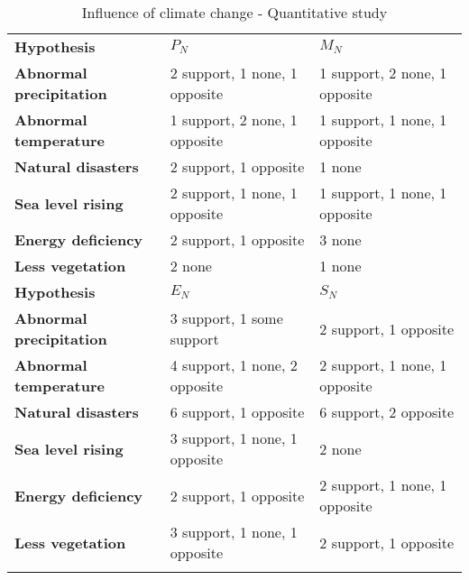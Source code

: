 \documentclass{mcmthesis}
\newlength\savedwidth
\newcommand\whline{\noalign{\global\savedwidth\arrayrulewidth
		\global\arrayrulewidth 1.2pt}%
	\hline
	\noalign{\global\arrayrulewidth\savedwidth}}
\newlength\savewidth
\newcommand\shline{\noalign{\global\savewidth\arrayrulewidth
		\global\arrayrulewidth 1.2pt}%
	\hline
	\noalign{\global\arrayrulewidth\savewidth}}
\begin{document}
	\begin{table}[htbp]
		\renewcommand\arraystretch{1.5}
		\footnotesize
		\centering
		\begin{tabular}{m{3.8cm}<{\centering}|m{4.8cm}<{\centering}|m{4.8cm}<{\centering}}
			\whline
			\textbf{Hypothesis}&\textbf{$P_N$}&\textbf{$M_N$}\\
			\whline
			\textbf{Abnormal precipitation}& 2 support, 1 none, 1 opposite &1 support, 2 none, 1 opposite\\
			
			\textbf{Abnormal temperature}&1 support, 2 none, 1 opposite&1 support, 1 none, 1 opposite\\
			
			\textbf{Natural disasters}&2 support, 1 opposite&1 none\\
			
			\textbf{Sea level rising}&2 support, 1 none, 1 opposite&1 support, 1 none, 1 opposite\\
			
			\textbf{Energy deficiency}&2 support, 1 opposite&3 none\\
			
			\textbf{Less vegetation}&2 none&1 none\\
			
			\shline
			\textbf{Hypothesis}&\textbf{$E_N$}&\textbf{$S_N$}\\
			\whline
			\textbf{Abnormal precipitation}& 3 support, 1 some support &2 support, 1 opposite\\
			
			\textbf{Abnormal temperature}&4 support, 1 none, 2 opposite&2 support, 1 none, 1 opposite\\
			
			\textbf{Natural disasters}&6 support, 1 opposite&6 support, 2 opposite\\
			
			\textbf{Sea level rising}&3 support, 1 none, 1 opposite&2 none\\
			
			\textbf{Energy deficiency}&2 support, 1 opposite&2 support, 1 none, 1 opposite\\
			
			\textbf{Less vegetation}&3 support, 1 none, 1 opposite&2 support, 1 opposite\\
			\shline
		\end{tabular}
		\caption{Influence of climate change - Quantitative study}\label{tab:Influence of climate change - Quantitative study}
	\end{table}
	
\end{document}
